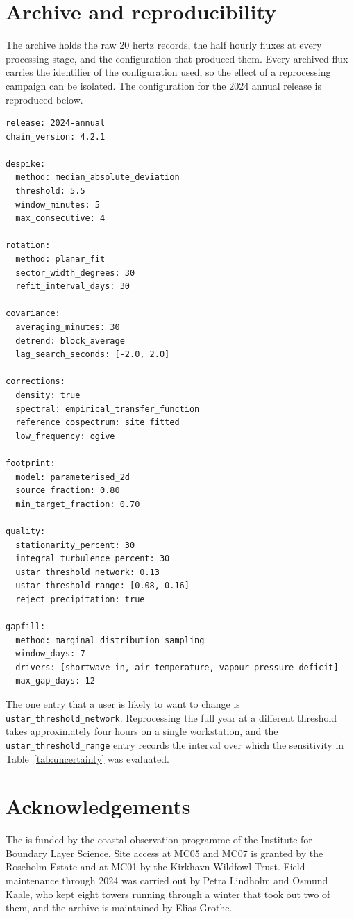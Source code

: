 \section{Archive and reproducibility}
\label{sec:archive}

The archive holds the raw 20 hertz records, the half hourly fluxes at every
processing stage, and the configuration that produced them. Every archived flux
carries the identifier of the configuration used, so the effect of a
reprocessing campaign can be isolated. The configuration for the 2024 annual
release is reproduced below.

\begin{lstlisting}[caption={Processing configuration for the 2024 annual release.},label={lst:config}]
release: 2024-annual
chain_version: 4.2.1

despike:
  method: median_absolute_deviation
  threshold: 5.5
  window_minutes: 5
  max_consecutive: 4

rotation:
  method: planar_fit
  sector_width_degrees: 30
  refit_interval_days: 30

covariance:
  averaging_minutes: 30
  detrend: block_average
  lag_search_seconds: [-2.0, 2.0]

corrections:
  density: true
  spectral: empirical_transfer_function
  reference_cospectrum: site_fitted
  low_frequency: ogive

footprint:
  model: parameterised_2d
  source_fraction: 0.80
  min_target_fraction: 0.70

quality:
  stationarity_percent: 30
  integral_turbulence_percent: 30
  ustar_threshold_network: 0.13
  ustar_threshold_range: [0.08, 0.16]
  reject_precipitation: true

gapfill:
  method: marginal_distribution_sampling
  window_days: 7
  drivers: [shortwave_in, air_temperature, vapour_pressure_deficit]
  max_gap_days: 12
\end{lstlisting}

The one entry that a user is likely to want to change is
\texttt{ustar\_threshold\_network}. Reprocessing the full year at a different
threshold takes approximately four hours on a single workstation, and the
\texttt{ustar\_threshold\_range} entry records the interval over which the
sensitivity in Table~\ref{tab:uncertainty} was evaluated.

\section*{Acknowledgements}

The \network{} is funded by the coastal observation programme of the Institute
for Boundary Layer Science. Site access at MC05 and MC07 is granted by the
Roseholm Estate and at MC01 by the Kirkhavn Wildfowl Trust. Field maintenance
through 2024 was carried out by Petra Lindholm and Osmund Kaale, who kept eight
towers running through a winter that took out two of them, and the archive is
maintained by Elias Grothe.
